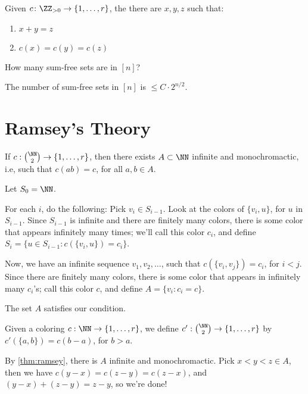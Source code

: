 \begin{thm}[Schur, 1916] \label{thm:schur}
	Given $c \colon \ZZ_{>0} \to \{1, \dots, r\}$, the there are $x, y, z$ such that:
	\begin{enumerate}[label = \textbullet]
		\item $x + y = z$
		\item $c(x) = c(y) = c(z)$
	\end{enumerate}
\end{thm}

\begin{prob}
	How many sum-free sets are in $[n]$?
\end{prob}

\begin{conj}
	The number of sum-free sets in $[n]$ is $\le C\cdot2^{n/2}$.
\end{conj}

\newpage
\section{Ramsey's Theory}

\begin{thm}\label{thm:ramsey}
	If $c: \binom{\NN}{2} \to \{1, \dots, r\}$, then there exists $A \subset \NN$ infinite and monochromactic, i.e, such that $c(ab) = c$, for all $a, b \in A$.
\end{thm}

\begin{dem}
	Let $S_0 = \NN$.

	For each $i$, do the following:
	Pick $v_i \in S_{i-1}$. Look at the colors of $\{v_i, u\}$, for $u$ in $S_{i-1}$. Since  $S_{i-1}$ is infinite and there are finitely many colors, there is some color that appears infinitely many times; we'll call this color $c_i$, and define $S_i = \{u \in S_{i-1} \colon c(\{v_i, u\}) = c_i\}$.

	Now, we have an infinite sequence $v_1, v_2, \dots$, such that $c(\{v_i, v_j\}) = c_i$, for $i < j$. Since there are finitely many colors, there is some color that appears in infinitely many $c_i$'s; call this color $c$, and define $A = \{v_i \colon c_i = c\}$.

	The set $A$ satisfies our condition.
\end{dem}

\begin{dem}
Given a coloring $c: \NN \to \{1, \dots, r\}$, we define $c': \binom{\NN}{2} \to \{1, \dots, r\}$ by $c'(\{a, b\}) = c(b - a)$, for $b > a$. 

By \cref{thm:ramsey}, there is $A$ infinite and monochromactic. Pick $x < y < z \in A$, then we have $c(y - x) = c(z - y) = c(z - x)$, and $(y - x) + (z - y) = z - y$, so we're done!
\end{dem}

